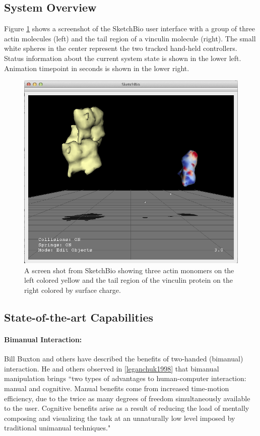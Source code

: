 \documentclass[twocolumn]{bmcart}%
\begin{document}
\subsection*{System Overview}

Figure \ref{fig:actin_vinculin} shows a screenshot of the SketchBio user interface with a group of three actin molecules (left) and the tail region of a vinculin molecule (right).  The small white spheres in the center represent the two tracked hand-held controllers. Status information about the current system state is shown in the lower left.  Animation timepoint in seconds is shown in the lower right.

\begin{figure}[ht]
\centering
\includegraphics[width=0.9\columnwidth]{actinVinculin.png}
\caption{A screen shot from SketchBio showing three actin monomers on the left colored yellow and the tail region of the vinculin protein on the right colored by surface charge.}
\label{fig:actin_vinculin}
\end{figure}

\subsection*{State-of-the-art Capabilities}

\paragraph*{Bimanual Interaction:}
Bill Buxton and others have described the benefits of two-handed (bimanual) interaction.  He and others observed in \ref{leganchuk1998} that bimanual manipulation brings ``two types of advantages to human-computer interaction: manual and cognitive. Manual benefits come from increased time-motion efficiency, due to the twice as many degrees of freedom simultaneously available to the user. Cognitive benefits arise as a result of reducing the load of mentally composing and visualizing the task at an unnaturally low level imposed by traditional unimanual techniques."
\end{document}
